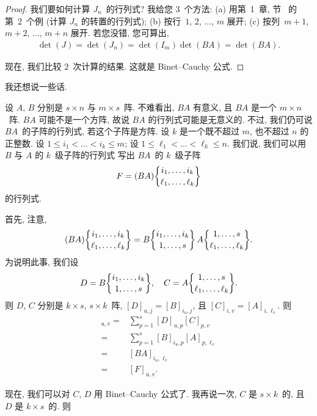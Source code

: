 \documentclass[../libro.tex]{subfiles}
\begin{document}
\begin{proof}
    我们要如何计算 \(J_n\)~的行列式?
    我给您 \(3\)~个方法:
    (a)
    用第~1~章, 节~ 的第~2~个例
    (计算 \(J_n\) 的转置的行列式);
    (b)
    按行~\(1\), \(2\), \(\dots\), \(m\) 展开;
    (c)
    按列~\(m+1\), \(m+2\), \(\dots\), \(m+n\) 展开.
    若您没错, 您可算出,
    \begin{align*}
        \det {(J)}
        = \det {(J_n)}
        = \det {(I_m)} \det {(BA)}
        = \det {(BA)}.
    \end{align*}

    现在, 我们比较 \(2\)~次计算的结果.
    这就是 Binet--Cauchy 公式.
\end{proof}

我还想说一些话.

设 \(A\), \(B\) 分别是 \(s \times n\) 与 \(m \times s\)~阵.
不难看出, \(BA\) 有意义, 且 \(BA\) 是一个 \(m \times n\)~阵.
\(BA\) 可能不是一个方阵, 故说 \(BA\) 的行列式可能是无意义的.
不过, 我们仍可说 \(BA\)~的子阵的行列式, 若这个子阵是方阵.
设 \(k\) 是一个既不超过 \(m\), 也不超过 \(n\) 的正整数.
设 \(1 \leq i_1 < \dots < i_k \leq m\);
设 \(1 \leq \ell_1 < \dots < \ell_k \leq n\).
我们说, 我们可以用 \(B\) 与 \(A\) 的 \(k\)~级子阵的行列式%
写出 \(BA\)~的 \(k\)~级子阵
\begin{align*}
    F = (BA)\submat{i_1,\dots,i_k}{\ell_1,\dots,\ell_k}
\end{align*}
的行列式.

首先, 注意,
\begin{align*}
    (BA)\submat{i_1,\dots,i_k}{\ell_1,\dots,\ell_k}
    =
    B\submat{i_1,\dots,i_k}{1,\dots,s}
    \,
    A\submat{1,\dots,s}{\ell_1,\dots,\ell_k}.
\end{align*}
为说明此事, 我们设
\begin{align*}
    D = B\submat{i_1,\dots,i_k}{1,\dots,s},
    \quad
    C = A\submat{1,\dots,s}{\ell_1,\dots,\ell_k}.
\end{align*}
则 \(D\), \(C\) 分别是 \(k \times s\), \(s \times k\)~阵,
\([D]_{u,j} = [B]_{i_u,j}\),
且 \([C]_{i,v} = [A]_{i,\ell_v}\).
则
\begin{align*}
    [DC]_{u,v}
    = {} &
    \sum_{p = 1}^{s} {[D]_{u,p} [C]_{p,v}}
    \\
    = {} &
    \sum_{p = 1}^{s} {[B]_{i_u,p} [A]_{p,\ell_v}}
    \\
    = {} &
    [BA]_{i_u,\ell_v}
    \\
    = {} &
    [F]_{u,v}.
\end{align*}

现在, 我们可以对 \(C\), \(D\) 用 Binet--Cauchy 公式了.
我再说一次, \(C\) 是 \(s \times k\)~的,
且 \(D\) 是 \(k \times s\)~的.
则
\end{document}
